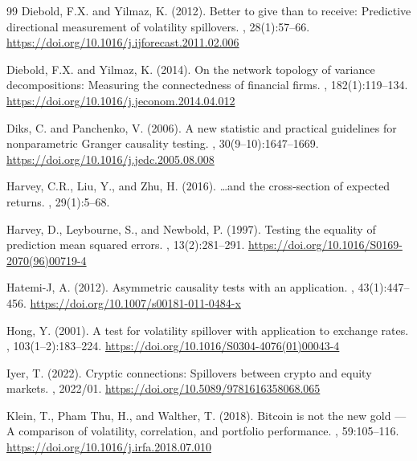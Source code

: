 \documentclass[11pt,a4paper]{article}
\begin{document}
\begin{thebibliography}{99}
Diebold, F.X. and Yilmaz, K. (2012).
\newblock Better to give than to receive: Predictive directional measurement of volatility spillovers.
, 28(1):57--66.
\newblock \url{https://doi.org/10.1016/j.ijforecast.2011.02.006}

Diebold, F.X. and Yilmaz, K. (2014).
\newblock On the network topology of variance decompositions: Measuring the connectedness of financial firms.
, 182(1):119--134.
\newblock \url{https://doi.org/10.1016/j.jeconom.2014.04.012}

Diks, C. and Panchenko, V. (2006).
\newblock A new statistic and practical guidelines for nonparametric Granger causality testing.
, 30(9--10):1647--1669.
\newblock \url{https://doi.org/10.1016/j.jedc.2005.08.008}

Harvey, C.R., Liu, Y., and Zhu, H. (2016).
\newblock \ldots and the cross-section of expected returns.
, 29(1):5--68.

Harvey, D., Leybourne, S., and Newbold, P. (1997).
\newblock Testing the equality of prediction mean squared errors.
, 13(2):281--291.
\newblock \url{https://doi.org/10.1016/S0169-2070(96)00719-4}

Hatemi-J, A. (2012).
\newblock Asymmetric causality tests with an application.
, 43(1):447--456.
\newblock \url{https://doi.org/10.1007/s00181-011-0484-x}

Hong, Y. (2001).
\newblock A test for volatility spillover with application to exchange rates.
, 103(1--2):183--224.
\newblock \url{https://doi.org/10.1016/S0304-4076(01)00043-4}

Iyer, T. (2022).
\newblock Cryptic connections: Spillovers between crypto and equity markets.
, 2022/01.
\newblock \url{https://doi.org/10.5089/9781616358068.065}

Klein, T., Pham Thu, H., and Walther, T. (2018).
\newblock Bitcoin is not the new gold --- A comparison of volatility, correlation, and portfolio performance.
, 59:105--116.
\newblock \url{https://doi.org/10.1016/j.irfa.2018.07.010}


\end{thebibliography}
\end{document}
